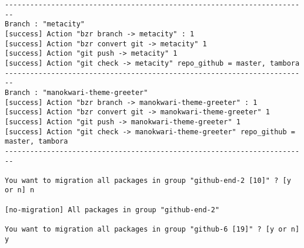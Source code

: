 {\begin{lstlisting}[language=ShellBash2]
------------------------------------------------------------------------
Branch : "metacity"
[success] Action "bzr branch -> metacity" : 1
[success] Action "bzr convert git -> metacity" 1
[success] Action "git push -> metacity" 1
[success] Action "git check -> metacity" repo_github = master, tambora
------------------------------------------------------------------------
Branch : "manokwari-theme-greeter"
[success] Action "bzr branch -> manokwari-theme-greeter" : 1
[success] Action "bzr convert git -> manokwari-theme-greeter" 1
[success] Action "git push -> manokwari-theme-greeter" 1
[success] Action "git check -> manokwari-theme-greeter" repo_github = master, tambora
------------------------------------------------------------------------

You want to migration all packages in group "github-end-2 [10]" ? [y or n] n

[no-migration] All packages in group "github-end-2" 

You want to migration all packages in group "github-6 [19]" ? [y or n] y


\end{lstlisting}}
